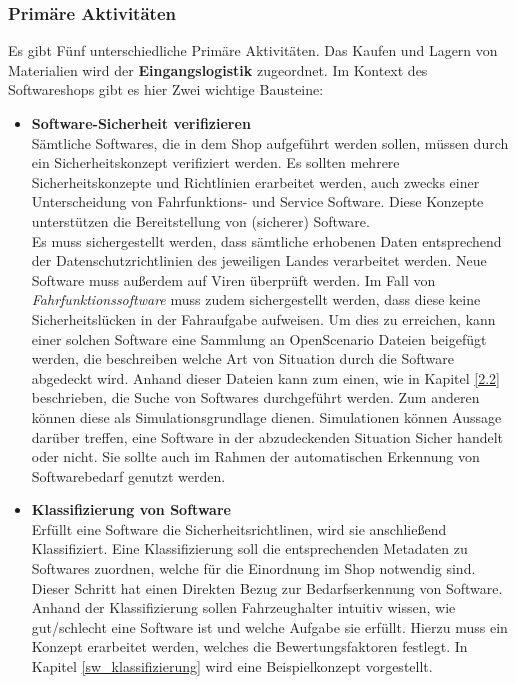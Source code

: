 \subsubsection{Primäre Aktivitäten}
Es gibt Fünf unterschiedliche Primäre Aktivitäten. Das Kaufen und Lagern von Materialien wird der \textbf{Eingangslogistik }zugeordnet. Im Kontext des Softwareshops gibt es hier Zwei wichtige Bausteine:
\begin{itemize}
	\item[] \hspace{-0.6cm}\textbf{Software-Sicherheit verifizieren}\\ \label{security}
	Sämtliche Softwares, die in dem Shop aufgeführt werden sollen, müssen durch ein Sicherheitskonzept verifiziert werden. Es sollten mehrere Sicherheitskonzepte und Richtlinien erarbeitet werden, auch zwecks einer Unterscheidung von Fahrfunktions- und Service Software. Diese Konzepte unterstützen die Bereitstellung von (sicherer) Software.\\
	Es muss sichergestellt werden, dass sämtliche erhobenen Daten entsprechend der Datenschutzrichtlinien des jeweiligen Landes verarbeitet werden. Neue Software muss außerdem auf Viren überprüft werden. Im Fall von \textit{Fahrfunktionssoftware }muss zudem sichergestellt werden, dass diese keine Sicherheitslücken in der Fahraufgabe aufweisen. Um dies zu erreichen, kann einer solchen Software eine Sammlung an OpenScenario Dateien beigefügt werden, die beschreiben welche Art von Situation durch die Software abgedeckt wird. Anhand dieser Dateien kann zum einen, wie in Kapitel \ref{2.2} beschrieben, die Suche von Softwares durchgeführt werden. Zum anderen können diese als Simulationsgrundlage dienen. Simulationen können Aussage darüber treffen, eine Software in der abzudeckenden Situation Sicher handelt oder nicht. Sie sollte auch im Rahmen der automatischen Erkennung von Softwarebedarf genutzt werden.
	
	\item[] \hspace{-0.6cm} \textbf{Klassifizierung von Software}\\
	Erfüllt eine Software die Sicherheitsrichtlinen, wird sie anschließend Klassifiziert. Eine Klassifizierung soll die entsprechenden Metadaten zu Softwares zuordnen, welche für die Einordnung im Shop notwendig sind. Dieser Schritt hat einen Direkten Bezug zur Bedarfserkennung von Software. Anhand der Klassifizierung sollen Fahrzeughalter intuitiv wissen, wie gut/schlecht eine Software ist und welche Aufgabe sie erfüllt. Hierzu muss ein Konzept erarbeitet werden, welches die Bewertungsfaktoren festlegt. In Kapitel \ref{sw_klassifizierung} wird eine Beispielkonzept vorgestellt.
\end{itemize}
